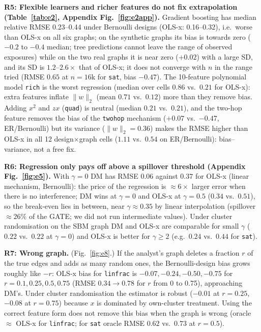 \textbf{R5: Flexible learners and richer features do not fix extrapolation (Table~\ref{tab:e2}, Appendix Fig.~\ref{fig:e2app}).} Gradient boosting has median relative RMSE 0.23--0.44 under Bernoulli designs (OLS-x: 0.16--0.32), i.e.\ worse than OLS-x on all six graphs; on the synthetic graphs its bias is towards zero ($-0.2$ to $-0.4$ median; tree predictions cannot leave the range of observed exposures) while on the two real graphs it is near zero ($+0.02$) with a large SD, and its SD is $1.2$--$2.6\times$ that of OLS-x; it does not converge with $n$ in the range tried (RMSE $0.65$ at $n{=}16$k for \texttt{sat}, bias $-0.47$). The 10-feature polynomial model \texttt{rich} is the worst regression (median over cells $0.86$ vs.\ $0.21$ for OLS-x): extra features inflate $\|w\|_2$ (mean $0.71$ vs.\ $0.12$) more than they remove bias. Adding $x^2$ and $zx$ (\texttt{quad}) is neutral (median $0.21$ vs.\ $0.21$), and the two-hop feature removes the bias of the \texttt{twohop} mechanism ($+0.07$ vs.\ $-0.47$, ER/Bernoulli) but its variance ($\|w\|_2=0.36$) makes the RMSE higher than OLS-x in all 12 design$\times$graph cells ($1.11$ vs.\ $0.54$ on ER/Bernoulli): bias--variance, not a free fix.

\textbf{R6: Regression only pays off above a spillover threshold (Appendix Fig.~\ref{fig:e5}).} With $\gamma{=}0$ DM has RMSE $0.06$ against $0.37$ for OLS-x (linear mechanism, Bernoulli): the price of the regression is $\approx6\times$ larger error when there is no interference; DM wins at $\gamma{=}0$ and OLS-x at $\gamma{=}0.5$ ($0.34$ vs.\ $0.51$), so the break-even lies in between, near $\gamma\approx0.35$ by linear interpolation (spillover $\approx26\%$ of the GATE; we did not run intermediate values). Under cluster randomisation on the SBM graph DM and OLS-x are comparable for small $\gamma$ ($0.22$ vs.\ $0.22$ at $\gamma{=}0$) and OLS-x is better for $\gamma\ge2$ (e.g.\ $0.24$ vs.\ $0.44$ for \texttt{sat}).

\textbf{R7: Wrong graph.} (Fig.~\ref{fig:e8}.) If the analyst's graph deletes a fraction $r$ of the true edges and adds as many random ones, the Bernoulli-design bias grows roughly like $-r$: OLS-x bias for \texttt{linfrac} is $-0.07,-0.24,-0.50,-0.75$ for $r=0.1,0.25,0.5,0.75$ (RMSE $0.34\to0.78$ for $r$ from 0 to 0.75), approaching DM's. Under cluster randomisation the estimator is robust ($-0.01$ at $r{=}0.25$, $-0.08$ at $r{=}0.75$) because $x$ is dominated by own-cluster treatment. Using the correct feature form does not remove this bias when the graph is wrong (oracle $\approx$ OLS-x for \texttt{linfrac}; for \texttt{sat} oracle RMSE $0.62$ vs.\ $0.73$ at $r{=}0.5$).



